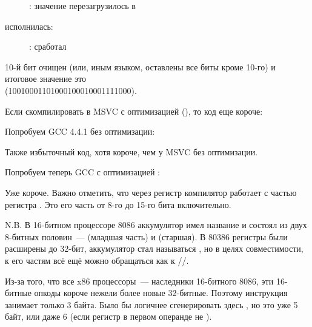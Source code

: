 \begin{figure}[H]
\centering
{}
\caption{\olly: значение перезагрузилось в \EDX}
\label{fig:set_reset_olly3}
\end{figure}

\clearpage
\AND исполнилась:

\begin{figure}[H]
\centering
{}
\caption{\olly: \AND сработал}
\label{fig:set_reset_olly4}
\end{figure}

10-й бит очищен (или, иным языком, оставлены все биты кроме 10-го) и итоговое значение это \\
 (1001000110100010001{\color{red}0}001111000).


Если скомпилировать в MSVC с оптимизацией (\Ox), то код еще короче:




Попробуем GCC 4.4.1 без оптимизации:



Также избыточный код, хотя короче, чем у MSVC без оптимизации.

Попробуем теперь GCC с оптимизацией \Othree:




Уже короче. Важно отметить, что через регистр \AH компилятор работает с частью регистра \EAX. 
Это его часть от 8-го до 15-го бита включительно.


N.B. В 16-битном процессоре 8086 аккумулятор имел название \AX 
и состоял из двух 8-битных половин~--- \AL (младшая часть) и \AH (старшая). 
В 80386 регистры были расширены до 32-бит, 
аккумулятор стал называться \EAX, но в целях совместимости, к его  частям всё ещё можно 
обращаться как к \AX/\AH/\AL.

Из-за того, что все x86 процессоры~--- наследники 16-битного 8086, эти  16-битные опкоды короче 
нежели более новые 32-битные. 
Поэтому инструкция  занимает только 3 байта. 
Было бы логичнее сгенерировать здесь , но это уже 5 байт, или даже 6 
(если регистр в первом операнде не \EAX).

